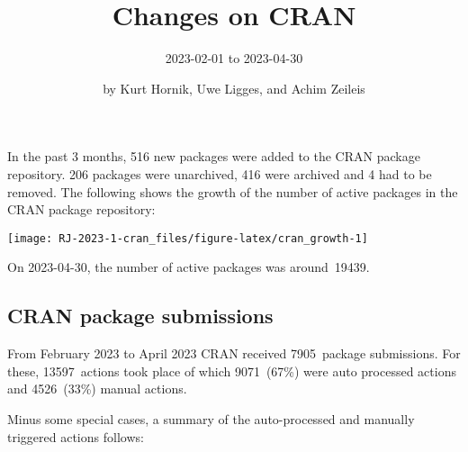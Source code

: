 \title{Changes on CRAN}

\subtitle{%
2023-02-01 to 2023-04-30
}

\author{by Kurt Hornik, Uwe Ligges, and Achim Zeileis}

\maketitle


In the past 3 months, 516 new packages were
added to the CRAN package repository. 206
packages were unarchived, 416 were archived and
4 had to be removed. The following shows the
growth of the number of active packages in the CRAN package repository:

\begin{center}\texttt{[image: RJ-2023-1-cran\_files/figure-latex/cran\_growth-1]} \end{center}

\noindent On 2023-04-30, the number of active packages was around~19439.

\hypertarget{cran-package-submissions}{%
\subsection{CRAN package submissions}\label{cran-package-submissions}}

From February 2023 to April 2023
CRAN received 7905~package submissions.
For these, 13597~actions took place of which
9071~(67\%) were auto processed actions and
4526~(33\%) manual actions.

Minus some special cases, a summary of the auto-processed and manually
triggered actions follows:

